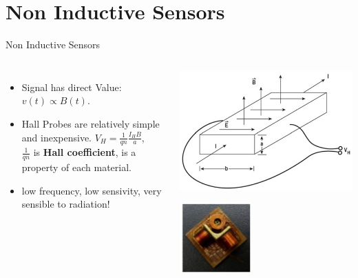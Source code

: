 \documentclass{beamer}
\begin{document}
\section{Non Inductive Sensors}
\begin{frame}{Non Inductive Sensors}{}
	\begin{columns}
		\begin{itemize}
			\item Signal has direct Value: $v(t) \propto B(t)$.
			\item Hall Probes are relatively simple and inexpensive. $V_H=\frac{1}{q n} \frac{I_H B}{a}$, \\
			$\frac{1}{q n} $ is \textbf{Hall coefficient}, is a property of each material.
			\item {\color{red} low frequency, low sensivity,  very sensible to radiation!}
		\end{itemize}
			\begin{center}
				\includegraphics[width=0.8 \columnwidth]{Hall.png}

				\includegraphics[width=0.4 \columnwidth]{Hall.jpg}
			\end{center}
 	 \end{columns}
\end{frame}
\end{document}
